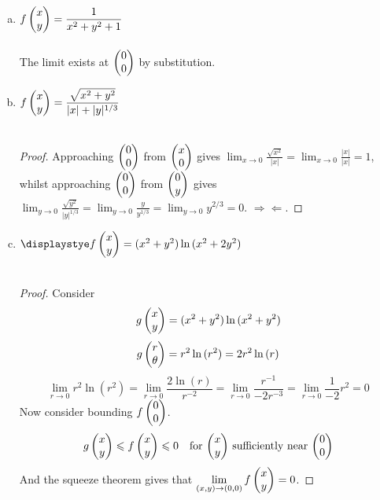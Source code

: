 \begin{enumerate}[a.]
  \item $\displaystyle f\begin{pmatrix} x \\ y \end{pmatrix} = \frac{1}{x^2+y^2+1}$ \\
   \\
  The limit exists at $\begin{pmatrix} 0 \\ 0 \end{pmatrix}$ by substitution.

  \item $\displaystyle f\begin{pmatrix} x \\ y \end{pmatrix} = \frac{\sqrt{x^2+y^2}}{|x|+|y|^{1/3}}$ \\
    \\
  \begin{proof}
    Approaching $\begin{pmatrix} 0 \\ 0 \end{pmatrix}$ from $\begin{pmatrix} x \\ 0 \end{pmatrix}$ gives $\displaystyle \lim_{x\rightarrow 0} \frac{\sqrt{x^2}}{|x|} = \lim_{x\rightarrow 0}\frac{|x|}{|x|} = 1$, whilst approaching $\begin{pmatrix} 0 \\ 0 \end{pmatrix}$ from $\begin{pmatrix} 0 \\ y \end{pmatrix}$ gives $\displaystyle \lim_{y\rightarrow 0} \frac{\sqrt{y^2}}{|y|^{1/3}}=\lim_{y\rightarrow 0}\frac{y}{y^{1/3}}=\lim_{y\rightarrow 0}y^{2/3}=0$. $\Rightarrow\!\Leftarrow$.
  \end{proof}

  \item $\displaystye f\Point{x \\ y} = (x^2 + y^2) \ln{(x^2+2y^2)}$ \\
  \\
  \begin{proof}
    Consider
  \[g\begin{pmatrix} x \\ y \end{pmatrix} = (x^2 + y^2) \ln{(x^2+y^2)}\]
  \[g\begin{pmatrix} r \\ \theta \end{pmatrix} = r^2 \ln{(r^2)}=2r^2 \ln{(r)}\]
  \[\lim_{r\rightarrow 0} r^2 \ln{(r^2)} = \lim_{r\rightarrow 0} \frac{2\ln{(r)}}{r^{-2}} = \lim_{r\rightarrow 0} \frac{r^{-1}}{-2r^{-3}} = \lim_{r\rightarrow 0} \frac{1}{-2} r^2=0\]
  Now consider bounding $f\begin{pmatrix} 0 \\ 0 \end{pmatrix}$.
  \[g\begin{pmatrix} x \\ y \end{pmatrix} \leqslant f\begin{pmatrix} x \\ y \end{pmatrix} \leqslant 0 \quad \text{for $\begin{pmatrix} x \\ y \end{pmatrix}$ sufficiently near $\begin{pmatrix} 0 \\ 0 \end{pmatrix}$}\]
  And the squeeze theorem gives that $\displaystyle \lim_{(x,y)\rightarrow (0,0)}f\begin{pmatrix} x \\ y \end{pmatrix} = 0$. \end{proof}


\end{enumerate}
